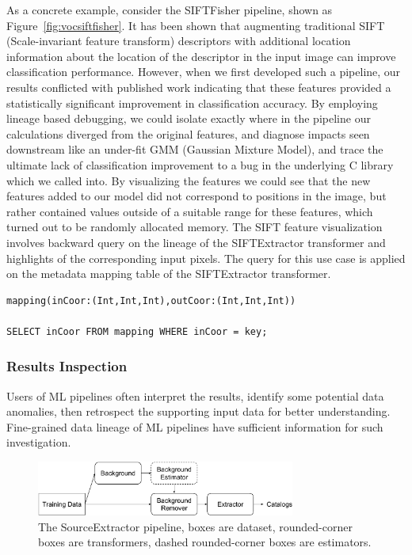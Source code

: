 \documentclass{sig-alternate}
\begin{document}
As a concrete example, consider the SIFTFisher pipeline, shown as Figure~\ref{fig:vocsiftfisher}. 
It has been shown that augmenting traditional SIFT~\cite{lowe99} (Scale-invariant feature transform) descriptors with additional location information about the location of the descriptor in the input image can improve classification performance.
However, when we first developed such a pipeline, our results conflicted with published work indicating that these features provided a statistically significant improvement in classification accuracy.
By employing lineage based debugging, we could isolate exactly where in the pipeline our calculations diverged from the original features, and diagnose impacts seen downstream like an under-fit GMM (Gaussian Mixture Model), and trace the ultimate lack of classification improvement to a bug in the underlying C library which we called into.
By visualizing the features we could see that the new features added to our model did not correspond to positions in the image, but rather contained values outside of a suitable range for these features, which turned out to be randomly allocated memory. The SIFT feature visualization involves backward query on the lineage of the SIFTExtractor transformer and highlights of the corresponding input pixels.
The query for this use case is applied on the metadata mapping table of the SIFTExtractor transformer.
\begin{lstlisting}
mapping(inCoor:(Int,Int,Int),outCoor:(Int,Int,Int))

SELECT inCoor FROM mapping WHERE inCoor = key;
\end{lstlisting}

\subsubsection{Results Inspection}
Users of ML pipelines often interpret the results, identify some potential data anomalies, then retrospect the supporting input data for better understanding.
Fine-grained data lineage of ML pipelines have sufficient information for such investigation.

\begin{figure}[ht]
\begin{center}
    \includegraphics[width=85mm]{pictures/SourceExtractor}
    \caption {The SourceExtractor pipeline, boxes are dataset, rounded-corner boxes are transformers, dashed rounded-corner boxes are estimators.
    \label{fig:sourceextractor}
}
\end{center}
\end{figure}
\end{document}
